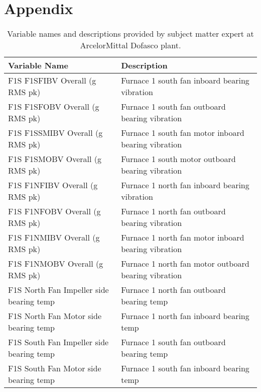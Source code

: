 \section*{Appendix}

\begin{table}[!h]
    \begin{tabular}{ll}
    \textbf{Variable Name}                   & \textbf{Description }                                   \\ \hline
    F1S F1SFIBV Overall (g RMS pk)           & Furnace 1 south fan inboard bearing vibration        \\
    F1S F1SFOBV Overall (g RMS pk)           & Furnace 1 south fan outboard bearing vibration       \\
    F1S F1SSMIBV Overall (g RMS pk)          & Furnace 1 south fan motor inboard bearing vibration  \\
    F1S F1SMOBV Overall (g RMS pk)           & Furnace 1 south motor outboard bearing vibration     \\
    F1S F1NFIBV Overall (g RMS pk)           & Furnace 1 north fan inboard bearing vibration        \\
    F1S F1NFOBV Overall (g RMS pk)           & Furnace 1 north fan outboard bearing vibration       \\
    F1S F1NMIBV Overall (g RMS pk)           & Furnace 1 north fan motor inboard bearing vibration  \\
    F1S F1NMOBV Overall (g RMS pk)           & Furnace 1 north fan motor outboard bearing vibration \\
    F1S North Fan Impeller side bearing temp & Furnace 1 north fan outboard bearing temp            \\
    F1S North Fan Motor side bearing temp    & Furnace 1 north fan inboard bearing temp             \\
    F1S South Fan Impeller side bearing temp & Furnace 1 south fan outboard bearing temp            \\
    F1S South Fan Motor side bearing temp    & Furnace 1 south fan inboard bearing temp            
    \end{tabular}
    \label{tbl:var}
    \caption{Variable names and descriptions provided by subject matter expert at ArcelorMittal Dofasco plant.}
\end{table}
